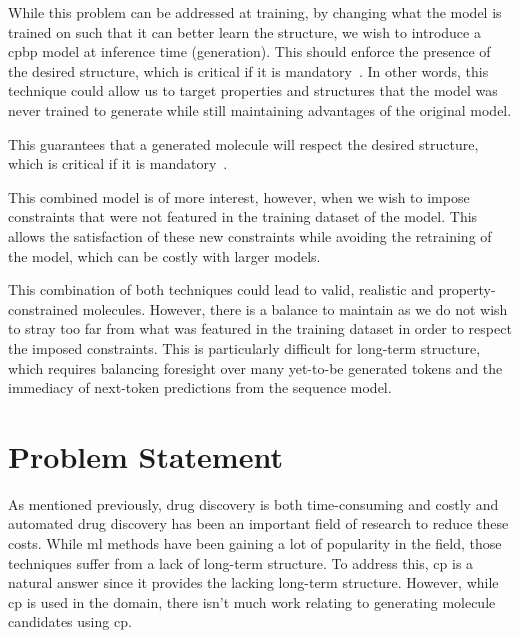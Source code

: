 \documentclass[../Document.tex]{subfiles}
\begin{document}
While this problem can be addressed at training, by changing what the model is trained on such that it can better learn the structure, we wish to introduce a \gls{cpbp} model at inference time (generation). This should enforce the presence of the desired structure, which is critical if it is mandatory~\cite{deutsch2019general,lee2019gradient}.
In other words, this technique could allow us to target properties and structures that the model was never trained to generate while still maintaining advantages of the original model.

This guarantees that a generated molecule will respect the desired structure, which is critical if it is mandatory~\cite{deutsch2019general,lee2019gradient}.

This combined model is of more interest, however, when we wish to impose constraints that were not featured in the training dataset of the model. This allows the satisfaction of these new constraints while avoiding the retraining of the model, which can be costly with larger models.

This combination of both techniques could lead to valid, realistic and property-constrained molecules. However, there is a balance to maintain as we do not wish to stray too far from what was featured in the training dataset in order to respect the imposed constraints. This is particularly difficult for long-term structure, which requires balancing foresight over many yet-to-be generated tokens and the immediacy of next-token predictions from the sequence model.















\section{Problem Statement}
\label{sec:intro/problem}

As mentioned previously, drug discovery is both time-consuming and costly and automated drug discovery has been an important field of research to reduce these costs.
While \gls{ml} methods have been gaining a lot of popularity in the field, those techniques suffer from a lack of long-term structure.
To address this, \gls{cp} is a natural answer since it provides the lacking long-term structure.
However, while \gls{cp} is used in the domain, there isn't much work  relating to generating molecule candidates using \gls{cp}.
\end{document}

